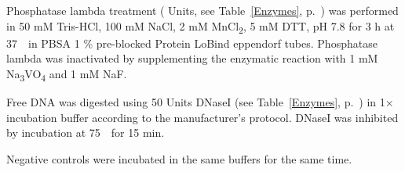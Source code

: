 Phosphatase lambda treatment ( Units, see Table~\ref{Enzymes}, p.~\pageref{Enzymes}) was performed in 50 mM Tris-HCl, 100 mM NaCl, 2 mM MnCl\textsubscript{2}, 5 mM DTT, pH 7.8 for 3 h at 37~\textcelsius~in PBSA 1 \% pre-blocked Protein LoBind eppendorf tubes. Phosphatase lambda was inactivated by supplementing the enzymatic reaction with 1 mM Na\textsubscript{3}VO\textsubscript{4} and 1 mM NaF. 

Free DNA was digested using 50 Units DNaseI (see Table~\ref{Enzymes}, p.~\pageref{Enzymes}) in 1$\times$ incubation buffer according to the manufacturer’s protocol. DNaseI was inhibited by incubation at 75~\textcelsius~for 15 min. 

Negative controls were incubated in the same buffers for the same time.





